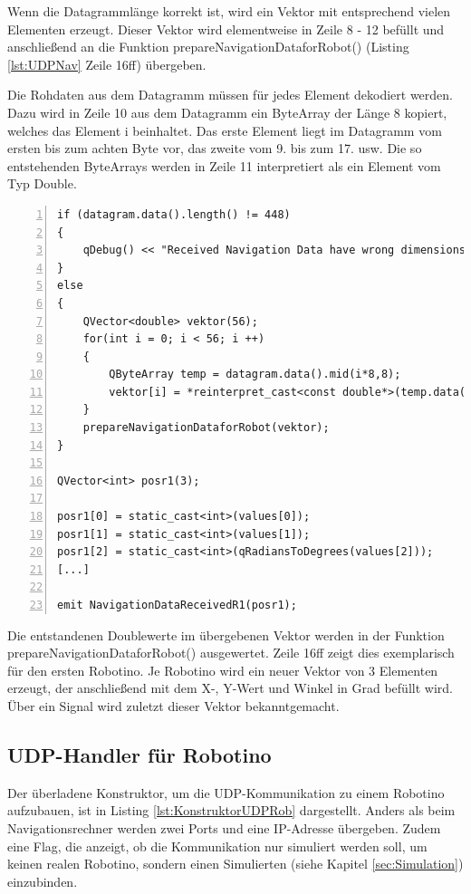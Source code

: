 Wenn die Datagrammlänge korrekt ist, wird ein Vektor mit entsprechend vielen Elementen erzeugt. Dieser Vektor wird elementweise in Zeile 8 - 12 befüllt und anschließend an die Funktion prepareNavigationDataforRobot() (Listing \ref{lst:UDPNav} Zeile 16ff) übergeben. 

Die Rohdaten aus dem Datagramm müssen für jedes Element dekodiert werden. Dazu wird in Zeile 10 aus dem Datagramm ein ByteArray der Länge 8 kopiert, welches das Element i beinhaltet. Das erste Element liegt im Datagramm vom ersten bis zum achten Byte vor, das zweite vom 9. bis zum 17. usw. Die so entstehenden ByteArrays werden in Zeile 11 interpretiert als ein Element vom Typ Double. 

\begin{lstlisting}[frame=single, breaklines=true, numbers=left, stepnumber=2, firstnumber=1, numberstyle = \tiny, caption=UDP-Handler Navigationsdatenaustausch,label=lst:UDPNav]
if (datagram.data().length() != 448)
{
    qDebug() << "Received Navigation Data have wrong dimensions: " << datagram.data().length();
}
else
{
    QVector<double> vektor(56);
    for(int i = 0; i < 56; i ++)
    {
        QByteArray temp = datagram.data().mid(i*8,8);
        vektor[i] = *reinterpret_cast<const double*>(temp.data());
    }
    prepareNavigationDataforRobot(vektor);
}

QVector<int> posr1(3);

posr1[0] = static_cast<int>(values[0]);
posr1[1] = static_cast<int>(values[1]);
posr1[2] = static_cast<int>(qRadiansToDegrees(values[2]));
[...]

emit NavigationDataReceivedR1(posr1);

\end{lstlisting}

Die entstandenen Doublewerte im übergebenen Vektor werden in der Funktion prepareNavigationDataforRobot() ausgewertet. Zeile 16ff zeigt dies exemplarisch für den ersten Robotino. Je Robotino wird ein neuer Vektor von 3 Elementen erzeugt, der anschließend mit dem X-, Y-Wert und Winkel in Grad befüllt wird. Über ein Signal wird zuletzt dieser Vektor bekanntgemacht. 

\subsection{UDP-Handler für Robotino}

Der überladene Konstruktor, um die UDP-Kommunikation zu einem Robotino aufzubauen, ist in Listing \ref{lst:KonstruktorUDPRob} dargestellt. Anders als beim Navigationsrechner werden zwei Ports und eine IP-Adresse übergeben. Zudem eine Flag, die anzeigt, ob die Kommunikation nur simuliert werden soll, um keinen realen Robotino, sondern einen Simulierten (siehe Kapitel \ref{sec:Simulation}) einzubinden. 

